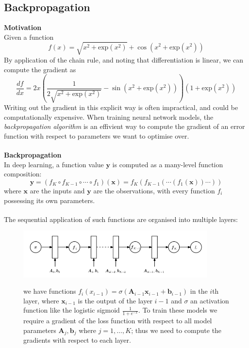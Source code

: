 \documentclass{report}
\begin{document}
\subsection{Backpropagation}
\textbf{Motivation}\\
Given a function
\begin{equation*}
f(x)=\sqrt{x^2+\text{exp}(x^2)}+\cos(x^2+\text{exp}(x^2))
\end{equation*}
By application of the chain rule, and noting that differentiation is linear, we can compute the gradient as
\begin{equation*}
\frac{df}{dx}=2x\left(\frac{1}{2\sqrt{x^2+\text{exp}(x^2)}}-\sin(x^2+\text{exp}(x^2))\right)(1+\text{exp}(x^2))
\end{equation*}
Writing out the gradient in this explicit way is often impractical, and could be computationally expensive. 
When training neural network models, the \textit{backpropagation algorithm} is an effivient way to compute
the gradient of an error function with respect to parameters we want to optimise over.\\
\vspace{1mm}\\
\textbf{Backpropagation}\\
In deep learning, a function value $\bm{y}$ is computed as a many-level function composition:
\begin{equation*}
\bm{y}=(f_K\circ f_{K-1}\circ\cdots\circ f_1)(\bm{x})
=f_K(f_{K-1}(\cdots(f_1(\bm{x}))\cdots))
\end{equation*}
where $\bm{x}$ are the inputs and $\bm{y}$ are the observations, with every function $f_i$ possessing its own parameters.\\
\vspace{1mm}\\
The sequential application of such functions are organised into multiple layers:
\begin{figure}[h]
\begin{center}
\includegraphics[width=10cm]{28}\\
\end{center}
we have functions $f_i(x_{i-1})=\sigma(\bm{A}_{i-1}\bm{x}_{i-1}+\bm{b}_{i-1})$ in the $i$th layer, where 
$\bm{x}_{i-1}$ is the output of the layer $i-1$ and $\sigma$ an activation function like the logistic sigmoid $\frac{
1}{1+e^{-x}}$. To train these models we require a gradient of the loss function with respect to all model parameters
$\bm{A}_j,\bm{b}_j$ where $j=1,\ldots,K$; thus we need to compute the gradients with respect to each layer.
\end{figure}\\
\end{document}

